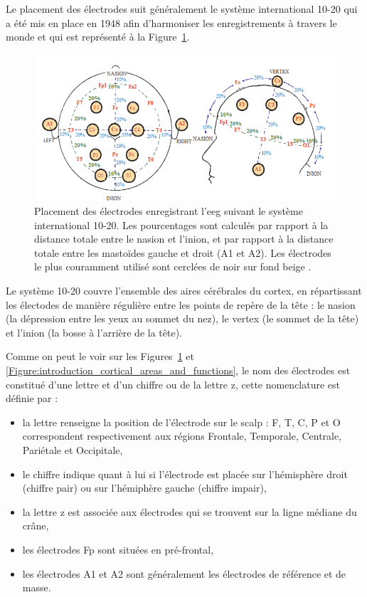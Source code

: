 Le placement des électrodes suit généralement le système international 10-20 qui a été mis en place en 1948 afin d'harmoniser les enregistrements à travers le monde 
\citep{Jasper1949, Sharbrough1991} et qui est représenté à la Figure~\ref{Figure:introduction_system_10_20}.

\begin{figure}[h!]
  \centering
	\includegraphics[width=1\linewidth]{figures/chapter-1/introduction-system-10-20} 
  \caption[Placement des électrodes enregistrant l'\gls{eeg} suivant le système international 10-20.]{Placement des électrodes enregistrant l'\gls{eeg} suivant le système international 10-20. 
	Les pourcentages sont calculés par rapport à la distance totale entre le nasion
	et l'inion, et par rapport à la distance totale entre les mastoïdes gauche et droit (A1 et A2). Les électrodes le plus couramment utilisé 
	sont cerclées de noir sur fond beige \citep{Marzbani2016}.}
  \label{Figure:introduction_system_10_20}
\end{figure}

Le système 10-20 couvre l'ensemble des aires cérébrales du cortex, en répartissant les électodes de manière régulière entre les points de repère de la tête : le nasion (la 
dépression entre les yeux au sommet du nez), le vertex (le sommet de la tête) et l'inion (la bosse à l'arrière de la tête). 

Comme on peut le voir sur les Figures~\ref{Figure:introduction_system_10_20} et \ref{Figure:introduction_cortical_areas_and_functions}, le nom des électrodes est 
constitué d'une lettre et d'un chiffre ou de la lettre z, cette nomenclature est définie par \citet{Jasper1949} :
\begin{itemize}
\item la lettre renseigne la position de l'électrode sur le scalp : F, T, C, P et O correspondent respectivement aux régions Frontale, Temporale, Centrale, Pariétale et Occipitale,
\item le chiffre indique quant à lui si l'électrode est placée sur l'hémisphère droit (chiffre pair) ou sur l'hémiphère gauche (chiffre impair),
\item la lettre z est associée aux électrodes qui se trouvent sur la ligne médiane du crâne,
\item les électrodes Fp sont situées en pré-frontal,
\item les électrodes A1 et A2 sont généralement les électrodes de référence et de masse.
\end{itemize}
  
